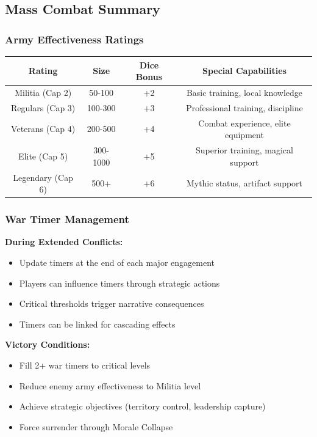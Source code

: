 \documentclass[11pt,letterpaper]{article}
\begin{document}
\subsection{Mass Combat Summary}

\subsubsection{Army Effectiveness Ratings}

\begin{center}
\begin{tabular}{|c|c|c|c|}
\hline
\textbf{Rating} & \textbf{Size} & \textbf{Dice Bonus} & \textbf{Special Capabilities} \\
\hline
Militia (Cap 2) & 50-100 & +2 & Basic training, local knowledge \\
\hline
Regulars (Cap 3) & 100-300 & +3 & Professional training, discipline \\
\hline
Veterans (Cap 4) & 200-500 & +4 & Combat experience, elite equipment \\
\hline
Elite (Cap 5) & 300-1000 & +5 & Superior training, magical support \\
\hline
Legendary (Cap 6) & 500+ & +6 & Mythic status, artifact support \\
\hline
\end{tabular}
\end{center}

\subsubsection{War Timer Management}

\textbf{During Extended Conflicts:}
\begin{itemize}[leftmargin=*]
    \item Update timers at the end of each major engagement
    \item Players can influence timers through strategic actions
    \item Critical thresholds trigger narrative consequences
    \item Timers can be linked for cascading effects
\end{itemize}

\textbf{Victory Conditions:}
\begin{itemize}[leftmargin=*]
    \item Fill 2+ war timers to critical levels
    \item Reduce enemy army effectiveness to Militia level
    \item Achieve strategic objectives (territory control, leadership capture)
    \item Force surrender through Morale Collapse
\end{itemize}
\end{document}
